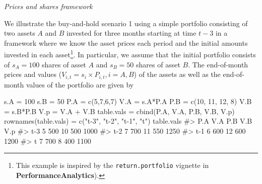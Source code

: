 \documentclass[
  letterpaper,
  DIV=11,
  numbers=noendperiod]{scrreprt}
\newenvironment{Shaded}{\begin{snugshade}}{\end{snugshade}}
\newcommand{\CommentTok}[1]{\textcolor[rgb]{0.37,0.37,0.37}{#1}}
\newcommand{\DecValTok}[1]{\textcolor[rgb]{0.68,0.00,0.00}{#1}}
\newcommand{\FunctionTok}[1]{\textcolor[rgb]{0.28,0.35,0.67}{#1}}
\newcommand{\NormalTok}[1]{\textcolor[rgb]{0.00,0.23,0.31}{#1}}
\newcommand{\OtherTok}[1]{\textcolor[rgb]{0.00,0.23,0.31}{#1}}
\newcommand{\SpecialCharTok}[1]{\textcolor[rgb]{0.37,0.37,0.37}{#1}}
\newcommand{\StringTok}[1]{\textcolor[rgb]{0.13,0.47,0.30}{#1}}
\theoremstyle{definition}
\theoremstyle{definition}
\theoremstyle{remark}
\begin{document}
\emph{Prices and shares framework}

We illustrate the buy-and-hold scenario 1 using a simple portfolio
consisting of two assets \(A\) and \(B\) invested for three months
starting at time \(t-3\) in a framework where we know the asset prices
each period and the initial amounts invested in each asset\footnote{This
  example is inspired by the \texttt{return.portfolio} vignette in
  \textbf{PerformanceAnalytics}).}. In particular, we assume that the
initial portfolio consists of \(s_A = 100\) shares of asset \(A\) and
\(s_B = 50\) shares of asset \(B\). The end-of-month prices and values
(\(V_{i,t} = s_i \times P_{i,t}, i=A,B\)) of the assets as well as the
end-of-month values of the portfolio are given by

\begin{Shaded}
\begin{Highlighting}[]
\NormalTok{s.A }\OtherTok{=} \DecValTok{100}
\NormalTok{s.B }\OtherTok{=} \DecValTok{50}
\NormalTok{P.A }\OtherTok{=} \FunctionTok{c}\NormalTok{(}\DecValTok{5}\NormalTok{,}\DecValTok{7}\NormalTok{,}\DecValTok{6}\NormalTok{,}\DecValTok{7}\NormalTok{)}
\NormalTok{V.A }\OtherTok{=}\NormalTok{ s.A}\SpecialCharTok{*}\NormalTok{P.A}
\NormalTok{P.B }\OtherTok{=} \FunctionTok{c}\NormalTok{(}\DecValTok{10}\NormalTok{, }\DecValTok{11}\NormalTok{, }\DecValTok{12}\NormalTok{, }\DecValTok{8}\NormalTok{)}
\NormalTok{V.B }\OtherTok{=}\NormalTok{ s.B}\SpecialCharTok{*}\NormalTok{P.B}
\NormalTok{V.p }\OtherTok{=}\NormalTok{ V.A }\SpecialCharTok{+}\NormalTok{ V.B}
\NormalTok{table.vals }\OtherTok{=} \FunctionTok{cbind}\NormalTok{(P.A, V.A, P.B, V.B, V.p)}
\FunctionTok{rownames}\NormalTok{(table.vals) }\OtherTok{=} \FunctionTok{c}\NormalTok{(}\StringTok{"t{-}3"}\NormalTok{, }\StringTok{"t{-}2"}\NormalTok{, }\StringTok{"t{-}1"}\NormalTok{, }\StringTok{"t"}\NormalTok{)}
\NormalTok{table.vals}
\CommentTok{\#\textgreater{}     P.A V.A P.B V.B  V.p}
\CommentTok{\#\textgreater{} t{-}3   5 500  10 500 1000}
\CommentTok{\#\textgreater{} t{-}2   7 700  11 550 1250}
\CommentTok{\#\textgreater{} t{-}1   6 600  12 600 1200}
\CommentTok{\#\textgreater{} t     7 700   8 400 1100}
\end{Highlighting}
\end{Shaded}
\end{document}
